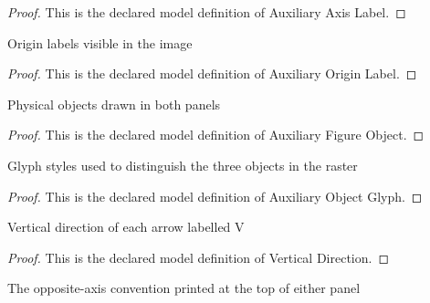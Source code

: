 \begin{proof}
  This is the declared model definition of Auxiliary Axis Label.
\end{proof}
\begin{definition}
  \label{def:physics:phyx-mini-0567:phyxminiproblems-problemphyxmini0567-auxiliaryoriginlabel}
  Origin labels visible in the image
\end{definition}
\begin{proof}
  This is the declared model definition of Auxiliary Origin Label.
\end{proof}
\begin{definition}
  \label{def:physics:phyx-mini-0567:phyxminiproblems-problemphyxmini0567-auxiliaryfigureobject}
  Physical objects drawn in both panels
\end{definition}
\begin{proof}
  This is the declared model definition of Auxiliary Figure Object.
\end{proof}
\begin{definition}
  \label{def:physics:phyx-mini-0567:phyxminiproblems-problemphyxmini0567-auxiliaryobjectglyph}
  Glyph styles used to distinguish the three objects in the raster
\end{definition}
\begin{proof}
  This is the declared model definition of Auxiliary Object Glyph.
\end{proof}
\begin{definition}
  \label{def:physics:phyx-mini-0567:phyxminiproblems-problemphyxmini0567-verticaldirection}
  Vertical direction of each arrow labelled V
\end{definition}
\begin{proof}
  This is the declared model definition of Vertical Direction.
\end{proof}
\begin{definition}
  \label{def:physics:phyx-mini-0567:phyxminiproblems-problemphyxmini0567-verticalcoordinaterelation}
  The opposite-axis convention printed at the top of either panel
\end{definition}
